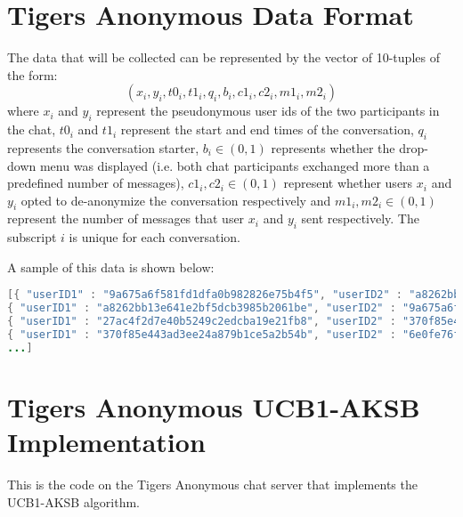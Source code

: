 \section{Tigers Anonymous Data Format}

The data that will be collected can be represented by the vector of 10-tuples of the form: $$(x_i, y_i, t0_i, t1_i, q_i, b_i, c1_i, c2_i, m1_i, m2_i)$$ where $x_i$ and $y_i$ represent the pseudonymous user ids of the two participants in the chat, $t0_i$ and $t1_i$ represent the start and end times of the conversation, $q_i$ represents the conversation starter, $b_i \in {(0, 1)}$ represents whether the drop-down menu was displayed (i.e. both chat participants exchanged more than a predefined number of messages), $c1_i, c2_i \in{(0, 1)}$ represent whether users $x_i$ and $y_i$ opted to de-anonymize the conversation respectively and $m1_i, m2_i \in{(0,1)}$ represent the number of messages that user $x_i$ and $y_i$ sent respectively. The subscript $i$ is unique for each conversation. 

A sample of this data is shown below: 

\begin{lstlisting}[language=java]
[{ "userID1" : "9a675a6f581fd1dfa0b982826e75b4f5", "userID2" : "a8262bb13e641e2bf5dcb3985b2061be", "question" : "Do you believe in love at first sight?", "startTime" : 1390873110621, "endTime" : 1390873162944, "buttonDisplayed" : false, "user1Clicked" : false, "user2Clicked" : false, "user1MessagesSent" : 1, "user2MessagesSent" : 0, "_id" : "52e70a4ac43b6d020079e52d", "__v" : 0 },
{ "userID1" : "a8262bb13e641e2bf5dcb3985b2061be", "userID2" : "9a675a6f581fd1dfa0b982826e75b4f5", "question" : "Do you believe in soul mates?", "startTime" : 1390873219878, "endTime" : 1390873263469, "buttonDisplayed" : false, "user1Clicked" : false, "user2Clicked" : false, "user1MessagesSent" : 1, "user2MessagesSent" : 2, "_id" : "52e70aafc43b6d020079e52e", "__v" : 0 },
{ "userID1" : "27ac4f2d7e40b5249c2edcba19e21fb8", "userID2" : "370f85e443ad3ee24a879b1ce5a2b54b", "question" : "What is one thing you miss about being a kid?", "startTime" : 1390876198530, "endTime" : 1390876307059, "buttonDisplayed" : false, "user1Clicked" : false, "user2Clicked" : false, "user1MessagesSent" : 1, "user2MessagesSent" : 0, "_id" : "52e71693c43b6d020079e52f", "__v" : 0 },
{ "userID1" : "370f85e443ad3ee24a879b1ce5a2b54b", "userID2" : "6e0fe76fca80cf2920bd5fc7717cf6dd", "question" : "What's one thing that you learned this week?", "startTime" : 1390881063228, "endTime" : 1390882681992, "buttonDisplayed" : true, "user1Clicked" : true, "user2Clicked" : true, "user1MessagesSent" : 33, "user2MessagesSent" : 37, "_id" : "52e72f79c43b6d020079e531", "__v" : 0 },
...]
\end{lstlisting}

\section{Tigers Anonymous UCB1-AKSB Implementation}

This is the code on the Tigers Anonymous chat server that implements the UCB1-AKSB algorithm.


